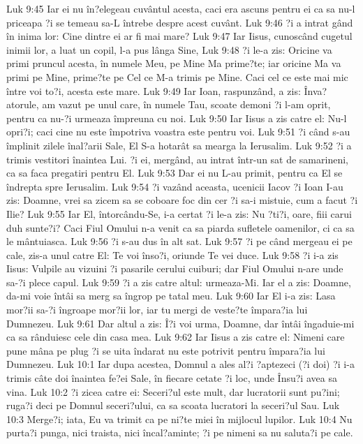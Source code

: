 Luk 9:45  Iar ei nu în?elegeau cuvântul acesta, caci era ascuns pentru ei ca sa nu-l priceapa ?i se temeau sa-L întrebe despre acest cuvânt.
Luk 9:46  ?i a intrat gând în inima lor: Cine dintre ei ar fi mai mare?
Luk 9:47  Iar Iisus, cunoscând cugetul inimii lor, a luat un copil, l-a pus lânga Sine,
Luk 9:48  ?i le-a zis: Oricine va primi pruncul acesta, în numele Meu, pe Mine Ma prime?te; iar oricine Ma va primi pe Mine, prime?te pe Cel ce M-a trimis pe Mine. Caci cel ce este mai mic între voi to?i, acesta este mare.
Luk 9:49  Iar Ioan, raspunzând, a zis: Înva?atorule, am vazut pe unul care, în numele Tau, scoate demoni ?i l-am oprit, pentru ca nu-?i urmeaza împreuna cu noi.
Luk 9:50  Iar Iisus a zis catre el: Nu-l opri?i; caci cine nu este împotriva voastra este pentru voi.
Luk 9:51  ?i când s-au împlinit zilele înal?arii Sale, El S-a hotarât sa mearga la Ierusalim.
Luk 9:52  ?i a trimis vestitori înaintea Lui. ?i ei, mergând, au intrat într-un sat de samarineni, ca sa faca pregatiri pentru El.
Luk 9:53  Dar ei nu L-au primit, pentru ca El se îndrepta spre Ierusalim.
Luk 9:54  ?i vazând aceasta, ucenicii Iacov ?i Ioan I-au zis: Doamne, vrei sa zicem sa se coboare foc din cer ?i sa-i mistuie, cum a facut ?i Ilie?
Luk 9:55  Iar El, întorcându-Se, i-a certat ?i le-a zis: Nu ?ti?i, oare, fiii carui duh sunte?i? Caci Fiul Omului n-a venit ca sa piarda sufletele oamenilor, ci ca sa le mântuiasca.
Luk 9:56  ?i s-au dus în alt sat.
Luk 9:57  ?i pe când mergeau ei pe cale, zis-a unul catre El: Te voi înso?i, oriunde Te vei duce.
Luk 9:58  ?i i-a zis Iisus: Vulpile au vizuini ?i pasarile cerului cuiburi; dar Fiul Omului n-are unde sa-?i plece capul.
Luk 9:59  ?i a zis catre altul: urmeaza-Mi. Iar el a zis: Doamne, da-mi voie întâi sa merg sa îngrop pe tatal meu.
Luk 9:60  Iar El i-a zis: Lasa mor?ii sa-?i îngroape mor?ii lor, iar tu mergi de veste?te împara?ia lui Dumnezeu.
Luk 9:61  Dar altul a zis: Î?i voi urma, Doamne, dar întâi îngaduie-mi ca sa rânduiesc cele din casa mea.
Luk 9:62  Iar Iisus a zis catre el: Nimeni care pune mâna pe plug ?i se uita îndarat nu este potrivit pentru împara?ia lui Dumnezeu.
Luk 10:1  Iar dupa acestea, Domnul a ales al?i ?aptezeci (?i doi) ?i i-a trimis câte doi înaintea fe?ei Sale, în fiecare cetate ?i loc, unde Însu?i avea sa vina.
Luk 10:2  ?i zicea catre ei: Seceri?ul este mult, dar lucratorii sunt pu?ini; ruga?i deci pe Domnul seceri?ului, ca sa scoata lucratori la seceri?ul Sau.
Luk 10:3  Merge?i; iata, Eu va trimit ca pe ni?te miei în mijlocul lupilor.
Luk 10:4  Nu purta?i punga, nici traista, nici încal?aminte; ?i pe nimeni sa nu saluta?i pe cale.
